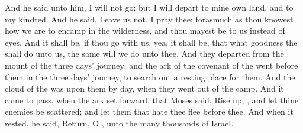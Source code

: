 \begin{biblechapter}
\verse And he said unto him, I will not go; but I will depart to mine own land, and to my kindred.
\verse And he said, Leave us not, I pray thee; forasmuch as thou knowest how we are to encamp in the wilderness, and thou mayest be to us instead of eyes.
\verse And it shall be, if thou go with us, yea, it shall be, that what goodness the \LORD shall do unto us, the same will we do unto thee.
\verse And they departed from the mount of the \LORD three days' journey: and the ark of the covenant of the \LORD went before them in the three days' journey, to search out a resting place for them.
\verse And the cloud of the \LORD was upon them by day, when they went out of the camp.
\verse And it came to pass, when the ark set forward, that Moses said, Rise up, \LORD, and let thine enemies be scattered; and let them that hate thee flee before thee.
\verse And when it rested, he said, Return, O \LORD, unto the many thousands of Israel.
\end{biblechapter}

